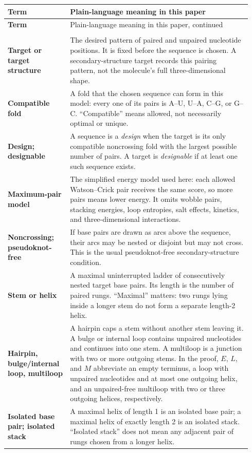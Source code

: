 \documentclass[11pt]{article}
\begin{document}
{\small
\setlength{\LTpre}{5pt}
\setlength{\LTpost}{5pt}
\renewcommand{\arraystretch}{1.12}
\begin{longtable}{@{}>{\raggedright\arraybackslash\bfseries}p{0.235\linewidth}>{\raggedright\arraybackslash}p{0.705\linewidth}@{}}
\toprule
Term & Plain-language meaning in this paper \\
\midrule
\endfirsthead
\toprule
Term & Plain-language meaning in this paper, continued \\
\midrule
\endhead
\bottomrule
\endfoot
\multicolumn{2}{@{}l}{\textcolor{DeepBlue}{\bfseries RNA structure and the design problem}}\\
\addlinespace[2pt]
Target or target structure & The desired pattern of paired and unpaired nucleotide positions.  It is fixed before the sequence is chosen.  A secondary-structure target records this pairing pattern, not the molecule's full three-dimensional shape. \\
\addlinespace[3pt]
Compatible fold & A fold that the chosen sequence can form in this model: every one of its pairs is A--U, U--A, C--G, or G--C.  ``Compatible'' means allowed, not necessarily optimal or unique. \\
\addlinespace[3pt]
Design; designable & A sequence is a \emph{design} when the target is its only compatible noncrossing fold with the largest possible number of pairs.  A target is \emph{designable} if at least one such sequence exists. \\
\addlinespace[3pt]
Maximum-pair model & The simplified energy model used here: each allowed Watson--Crick pair receives the same score, so more pairs means lower energy.  It omits wobble pairs, stacking energies, loop entropies, salt effects, kinetics, and three-dimensional interactions. \\
\addlinespace[3pt]
Noncrossing; pseudoknot-free & If base pairs are drawn as arcs above the sequence, their arcs may be nested or disjoint but may not cross.  This is the usual pseudoknot-free secondary-structure condition. \\
\addlinespace[3pt]
Stem or helix & A maximal uninterrupted ladder of consecutively nested target base pairs.  Its length is the number of paired rungs.  ``Maximal'' matters: two rungs lying inside a longer stem do not form a separate length-2 helix. \\
\addlinespace[3pt]
Hairpin, bulge/internal loop, multiloop & A hairpin caps a stem without another stem leaving it.  A bulge or internal loop contains unpaired nucleotides and continues into one stem.  A multiloop is a junction with two or more outgoing stems.  In the proof, $E$, $L$, and $M$ abbreviate an empty terminus, a loop with unpaired nucleotides and at most one outgoing helix, and an unpaired-free multiloop with two or three outgoing helices, respectively. \\
\addlinespace[3pt]
Isolated base pair; isolated stack & A maximal helix of length 1 is an isolated base pair; a maximal helix of exactly length 2 is an isolated stack.  ``Isolated stack'' does not mean any adjacent pair of rungs chosen from a longer helix. \\


\end{longtable}}
\end{document}
